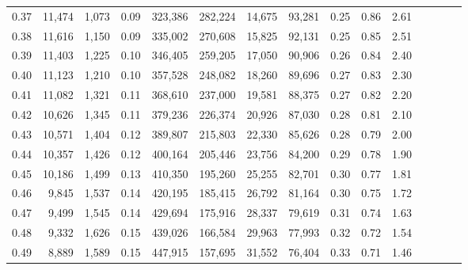 \begin{tabular}{rrrcrrrrrrrrrrr}
0.37 &  11,474 &  1,073 &                                       0.09 &  323,386 &  282,224 &   14,675 &   93,281 &  0.25 &  0.86 &                         2.61 \\
0.38 &  11,616 &  1,150 &                                       0.09 &  335,002 &  270,608 &   15,825 &   92,131 &  0.25 &  0.85 &                         2.51 \\
0.39 &  11,403 &  1,225 &                                       0.10 &  346,405 &  259,205 &   17,050 &   90,906 &  0.26 &  0.84 &                         2.40 \\
0.40 &  11,123 &  1,210 &                                       0.10 &  357,528 &  248,082 &   18,260 &   89,696 &  0.27 &  0.83 &                         2.30 \\
0.41 &  11,082 &  1,321 &                                       0.11 &  368,610 &  237,000 &   19,581 &   88,375 &  0.27 &  0.82 &                         2.20 \\
0.42 &  10,626 &  1,345 &                                       0.11 &  379,236 &  226,374 &   20,926 &   87,030 &  0.28 &  0.81 &                         2.10 \\
0.43 &  10,571 &  1,404 &                                       0.12 &  389,807 &  215,803 &   22,330 &   85,626 &  0.28 &  0.79 &                         2.00 \\
0.44 &  10,357 &  1,426 &                                       0.12 &  400,164 &  205,446 &   23,756 &   84,200 &  0.29 &  0.78 &                         1.90 \\
0.45 &  10,186 &  1,499 &                                       0.13 &  410,350 &  195,260 &   25,255 &   82,701 &  0.30 &  0.77 &                         1.81 \\
0.46 &   9,845 &  1,537 &                                       0.14 &  420,195 &  185,415 &   26,792 &   81,164 &  0.30 &  0.75 &                         1.72 \\
0.47 &   9,499 &  1,545 &                                       0.14 &  429,694 &  175,916 &   28,337 &   79,619 &  0.31 &  0.74 &                         1.63 \\
0.48 &   9,332 &  1,626 &                                       0.15 &  439,026 &  166,584 &   29,963 &   77,993 &  0.32 &  0.72 &                         1.54 \\
0.49 &   8,889 &  1,589 &                                       0.15 &  447,915 &  157,695 &   31,552 &   76,404 &  0.33 &  0.71 &                         1.46 \\

\end{tabular}
